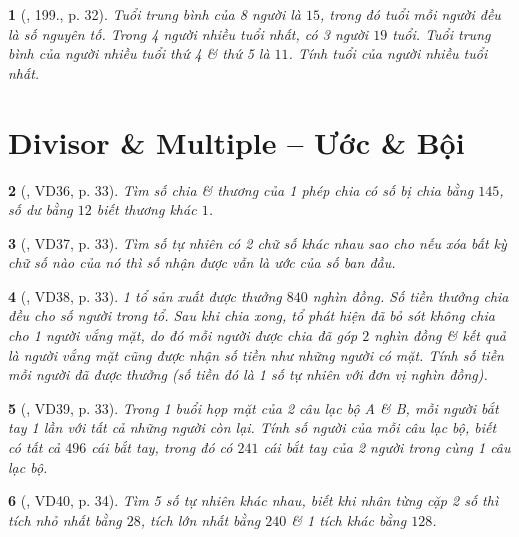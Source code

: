 \documentclass{article}
\newtheorem{baitoan}{}
\begin{document}
\begin{baitoan}[\cite{Binh_Toan_6_tap_1}, 199., p. 32]
	Tuổi trung bình của 8 người là $15$, trong đó tuổi mỗi người đều là số nguyên tố. Trong 4 người nhiều tuổi nhất, có 3 người $19$ tuổi. Tuổi trung bình của người nhiều tuổi thứ 4 \& thứ 5 là $11$. Tính tuổi của người nhiều tuổi nhất.
\end{baitoan}


\section{Divisor \& Multiple -- Ước \& Bội}

\begin{baitoan}[\cite{Binh_Toan_6_tap_1}, VD36, p. 33]
	Tìm số chia \& thương của 1 phép chia có số bị chia bằng $145$, số dư bằng $12$ biết thương khác $1$.
\end{baitoan}

\begin{baitoan}[\cite{Binh_Toan_6_tap_1}, VD37, p. 33]
	Tìm số tự nhiên có 2 chữ số khác nhau sao cho nếu xóa bất kỳ chữ số nào của nó thì số nhận được vẫn là ước của số ban đầu.
\end{baitoan}

\begin{baitoan}[\cite{Binh_Toan_6_tap_1}, VD38, p. 33]
	1 tổ sản xuất được thưởng $840$ nghìn đồng. Số tiền thưởng chia đều cho số người trong tổ. Sau khi chia xong, tổ phát hiện đã bỏ sót không chia cho 1 người vắng mặt, do đó mỗi người được chia đã góp $2$ nghìn đồng \& kết quả là người vắng mặt cũng được nhận số tiền như những người có mặt. Tính số tiền mỗi người đã được thưởng (số tiền đó là 1 số tự nhiên với đơn vị nghìn đồng).
\end{baitoan}

\begin{baitoan}[\cite{Binh_Toan_6_tap_1}, VD39, p. 33]
	Trong 1 buổi họp mặt của 2 câu lạc bộ A \& B, mỗi người bắt tay 1 lần với tất cả những người còn lại. Tính số người của mỗi câu lạc bộ, biết có tất cả $496$ cái bắt tay, trong đó có $241$ cái bắt tay của 2 người trong cùng 1 câu lạc bộ.
\end{baitoan}

\begin{baitoan}[\cite{Binh_Toan_6_tap_1}, VD40, p. 34]
	Tìm 5 số tự nhiên khác nhau, biết khi nhân từng cặp 2 số thì tích nhỏ nhất bằng $28$, tích lớn nhất bằng $240$ \& 1 tích khác bằng $128$.
\end{baitoan}
\end{document}
